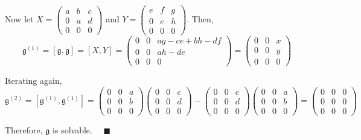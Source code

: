\documentclass[12pt]{article}
\newcommand{\g}{\mathfrak{g}}
\newcommand{\qed}{\quad \blacksquare}
\begin{document}
        Now let $X = \begin{pmatrix}
            a & b & c\\ 
            0 & a & d\\
            0 & 0 & 0
        \end{pmatrix}$ and $Y = \begin{pmatrix}
            e & f & g\\ 
            0 & e & h\\
            0 & 0 & 0
        \end{pmatrix}$. Then,
        \[\g^{(1)} = [\g, \g] = [X,Y] = \begin{pmatrix}
            0 & 0 & ag - ce + bh - df\\ 
            0 & 0 & ah - de\\
            0 & 0 & 0
        \end{pmatrix} = \begin{pmatrix}
            0 & 0 & x\\ 
            0 & 0 & y\\
            0 & 0 & 0
        \end{pmatrix}\]

        Iterating again, 
        \[\g^{(2)} = [\g^{(1)}, \g^{(1)}] = \begin{pmatrix}
            0 & 0 & a\\ 
            0 & 0 & b\\
            0 & 0 & 0
        \end{pmatrix}\begin{pmatrix}
            0 & 0 & c\\ 
            0 & 0 & d\\
            0 & 0 & 0
        \end{pmatrix} - \begin{pmatrix}
            0 & 0 & c\\ 
            0 & 0 & d\\
            0 & 0 & 0
        \end{pmatrix}\begin{pmatrix}
            0 & 0 & a\\ 
            0 & 0 & b\\
            0 & 0 & 0
        \end{pmatrix} = \begin{pmatrix}
            0 & 0 & 0\\ 
            0 & 0 & 0\\
            0 & 0 & 0
        \end{pmatrix}\]

        Therefore, $\g$ is solvable. $\qed$
 
    \color{black}
\end{document}
